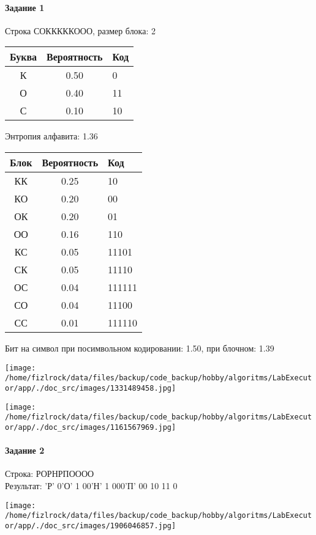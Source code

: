 \documentclass[a4paper, 12pt]{article}
\begin{document}
\paragraph{Задание 1}

Строка СОКККККООО, размер блока: 2
\begin{center}
 \begin{tabular}{ |c|c|l| } 
  \hline
     Буква & Вероятность & Код\\ \hline
К & 0.50 & 0\\\hline
О & 0.40 & 11\\\hline
С & 0.10 & 10
\\ \hline \end{tabular}
\end{center}
Энтропия алфавита: 1.36
\begin{center}
 \begin{tabular}{ |c|c|l| } 
  \hline
     Блок & Вероятность & Код\\ \hline
КК & 0.25 & 10\\\hline
КО & 0.20 & 00\\\hline
ОК & 0.20 & 01\\\hline
ОО & 0.16 & 110\\\hline
КС & 0.05 & 11101\\\hline
СК & 0.05 & 11110\\\hline
ОС & 0.04 & 111111\\\hline
СО & 0.04 & 11100\\\hline
СС & 0.01 & 111110
\\ \hline \end{tabular}
\end{center}
Бит на символ при посимвольном кодировании: 1.50, при блочном: 1.39

\texttt{[image: /home/fizlrock/data/files/backup/code\_backup/hobby/algoritms/LabExecutor/app/./doc\_src/images/1331489458.jpg]}

\texttt{[image: /home/fizlrock/data/files/backup/code\_backup/hobby/algoritms/LabExecutor/app/./doc\_src/images/1161567969.jpg]}
\pagebreak
\paragraph{Задание 2}

Строка: 
РОРНРПОООО\\
Результат: 'Р' 0'О' 1 00'Н' 1 000'П' 00 10 11 0

\texttt{[image: /home/fizlrock/data/files/backup/code\_backup/hobby/algoritms/LabExecutor/app/./doc\_src/images/1906046857.jpg]}
\end{document}
